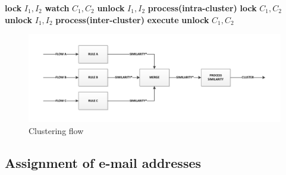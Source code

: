 \begin{algorithm}
\caption{!!!}
\label{mincutgusfield}
\begin{algorithmic}
\STATE \textbf{lock} $I_1,I_2$
  \STATE \textbf{watch} $C_1,C_2$
  \STATE \textbf{unlock} $I_1,I_2$
  \STATE \textbf{process(intra-cluster)}
\ELSE
  \STATE \textbf{lock} $C_1,C_2$
  \STATE \textbf{unlock} $I_1,I_2$
  \STATE \textbf{process(inter-cluster)}
  \STATE \textbf{execute}
  \STATE \textbf{unlock} $C_1,C_2$
\ENDIF
\end{algorithmic}
\end{algorithm}

\begin{figure}[htbp]
	\centering
		\includegraphics[width=1\textwidth]{fig/clusteringpipe}
	\caption{Clustering flow}
	\label{fig:clusteringpipe}
\end{figure}

\subsection{Assignment of e-mail addresses}